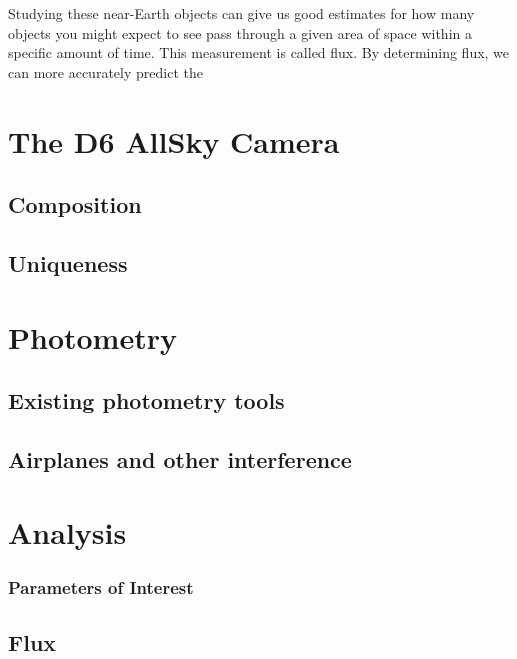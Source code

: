 Studying these near-Earth objects can give us good estimates for how many objects you might expect to see pass through a given area of space within a specific amount of time. 
This measurement is called flux.
By determining flux, we can more accurately predict the 


\section{The D6 AllSky Camera}

\subsection{Composition}



\subsection{Uniqueness}







\section{Photometry}

\subsection{Existing photometry tools}



\subsection{Airplanes and other interference}







\section{Analysis}

\subsubsection{Parameters of Interest}



\subsection{Flux}







